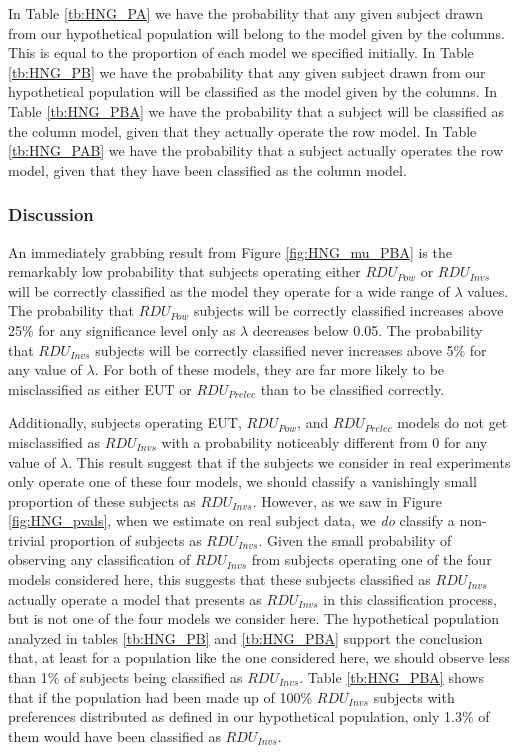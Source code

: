 \documentclass[../main.tex]{subfiles}
\providecommand{\DIFaddend}{} %
\begin{document}
\DIFaddend In Table \ref{tb:HNG_PA} we have the probability that any given subject drawn from our hypothetical population will belong to the model given by the columns.
This is equal to the proportion of each model we specified initially.
In Table \ref{tb:HNG_PB} we have the probability that any given subject drawn from our hypothetical population will be classified as the model given by the columns. 
In Table \ref{tb:HNG_PBA} we have the probability that a subject will be classified as the column model, given that they actually operate the row model.
In Table \ref{tb:HNG_PAB} we have the probability that a subject actually operates the row model, given that they have been classified as the column model.

\subsubsection{Discussion}

An immediately grabbing result from Figure \ref{fig:HNG_mu_PBA} is the remarkably low probability that subjects operating either $\mathit{RDU_{Pow}}$ or $\mathit{RDU_{Invs}}$ will be correctly classified as the model they operate for a wide range of $\lambda$ values.
The probability that $\mathit{RDU_{Pow}}$ subjects will be correctly classified increases above 25\% for any significance level only as $\lambda$ decreases below 0.05.
The probability that $\mathit{RDU_{Invs}}$ subjects will be correctly classified never increases above 5\% for any value of $\lambda$.
For both of these models, they are far more likely to be misclassified as either EUT or $\mathit{RDU_{Prelec}}$ than to be classified correctly.

Additionally, subjects operating EUT, $\mathit{RDU_{Pow}}$, and $\mathit{RDU_{Prelec}}$ models do not get misclassified as $\mathit{RDU_{Invs}}$ with a probability noticeably different from 0 for any value of $\lambda$.
This result suggest that if the subjects we consider in real experiments only operate one of these four models, we should classify a vanishingly small proportion of these subjects as $\mathit{RDU_{Invs}}$.
However, as we saw in Figure \ref{fig:HNG_pvals}, when we estimate on real subject data, we \textit{do} classify a non-trivial proportion of subjects as $\mathit{RDU_{Invs}}$.
Given the small probability of observing any classification of $\mathit{RDU_{Invs}}$ from subjects operating one of the four models considered here, this suggests that these subjects classified as $\mathit{RDU_{Invs}}$ actually operate a model that presents as $\mathit{RDU_{Invs}}$ in this classification process, but is not one of the four models we consider here.
The hypothetical population analyzed in tables \ref{tb:HNG_PB} and \ref{tb:HNG_PBA} support the conclusion that, at least for a population like the one considered here, we should observe less than 1\% of subjects being classified as $\mathit{RDU_{Invs}}$.
Table \ref{tb:HNG_PBA} shows that if the population had been made up of 100\% $\mathit{RDU_{Invs}}$ subjects with preferences distributed as defined in our hypothetical population, only 1.3\% of them would have been classified as $\mathit{RDU_{Invs}}$.
\end{document}
